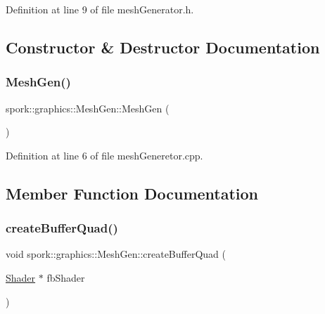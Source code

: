 Definition at line 9 of file mesh\+Generator.\+h.



\subsection{Constructor \& Destructor Documentation}
\mbox{\label{classspork_1_1graphics_1_1_mesh_gen_acc265ae1890d5a5268f48c5960de6a1f}} 
\subsubsection{\texorpdfstring{Mesh\+Gen()}{MeshGen()}}
{\footnotesize\ttfamily spork\+::graphics\+::\+Mesh\+Gen\+::\+Mesh\+Gen (\begin{DoxyParamCaption}{ }\end{DoxyParamCaption})}



Definition at line 6 of file mesh\+Generetor.\+cpp.



\subsection{Member Function Documentation}
\mbox{\label{classspork_1_1graphics_1_1_mesh_gen_ad15ba27a156496c1a538ab7852a444ac}} 
\subsubsection{\texorpdfstring{create\+Buffer\+Quad()}{createBufferQuad()}}
{\footnotesize\ttfamily void spork\+::graphics\+::\+Mesh\+Gen\+::create\+Buffer\+Quad (\begin{DoxyParamCaption}\item[{\hyperlink{classspork_1_1graphics_1_1_shader}{Shader} $\ast$}]{fb\+Shader }\end{DoxyParamCaption})}



